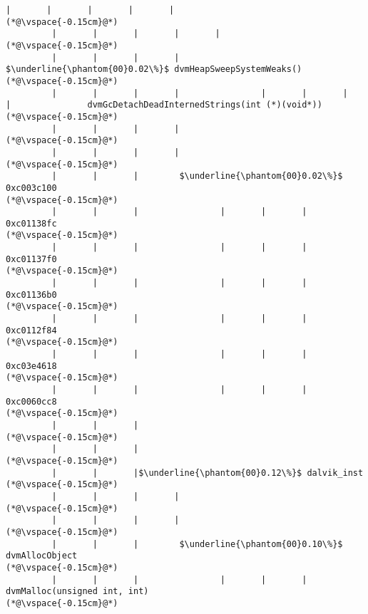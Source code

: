 \begin{lstlisting}[caption=NewDirectByteBuffer, label=profile:C2JNewDirectBuffer-512, numberbychapter=true, frame=lines, float, floatplacement=t]
         |       |       |       |       |
(*@\vspace{-0.15cm}@*)
         |       |       |       |       |
(*@\vspace{-0.15cm}@*)
         |       |       |       |        $\underline{\phantom{00}0.02\%}$ dvmHeapSweepSystemWeaks()
(*@\vspace{-0.15cm}@*)
         |       |       |       |                |       |       |       |               dvmGcDetachDeadInternedStrings(int (*)(void*))
(*@\vspace{-0.15cm}@*)
         |       |       |       |
(*@\vspace{-0.15cm}@*)
         |       |       |       |
(*@\vspace{-0.15cm}@*)
         |       |       |        $\underline{\phantom{00}0.02\%}$ 0xc003c100
(*@\vspace{-0.15cm}@*)
         |       |       |                |       |       |               0xc01138fc
(*@\vspace{-0.15cm}@*)
         |       |       |                |       |       |               0xc01137f0
(*@\vspace{-0.15cm}@*)
         |       |       |                |       |       |               0xc01136b0
(*@\vspace{-0.15cm}@*)
         |       |       |                |       |       |               0xc0112f84
(*@\vspace{-0.15cm}@*)
         |       |       |                |       |       |               0xc03e4618
(*@\vspace{-0.15cm}@*)
         |       |       |                |       |       |               0xc0060cc8
(*@\vspace{-0.15cm}@*)
         |       |       |
(*@\vspace{-0.15cm}@*)
         |       |       |
(*@\vspace{-0.15cm}@*)
         |       |       |$\underline{\phantom{00}0.12\%}$ dalvik_inst
(*@\vspace{-0.15cm}@*)
         |       |       |       |
(*@\vspace{-0.15cm}@*)
         |       |       |       |
(*@\vspace{-0.15cm}@*)
         |       |       |        $\underline{\phantom{00}0.10\%}$ dvmAllocObject
(*@\vspace{-0.15cm}@*)
         |       |       |                |       |       |               dvmMalloc(unsigned int, int)
(*@\vspace{-0.15cm}@*)

\end{lstlisting}
